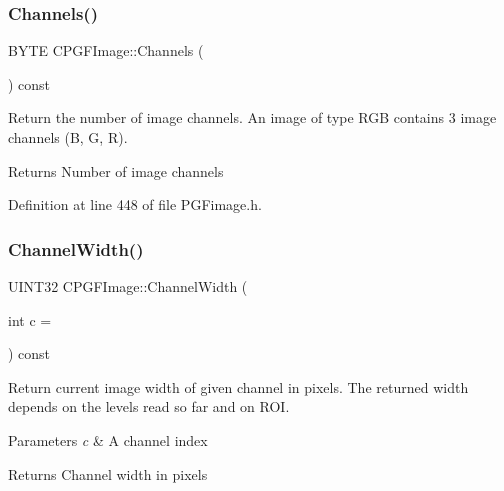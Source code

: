 \subsubsection{\texorpdfstring{Channels()}{Channels()}}
{\footnotesize\ttfamily B\+Y\+TE C\+P\+G\+F\+Image\+::\+Channels (\begin{DoxyParamCaption}{ }\end{DoxyParamCaption}) const\hspace{0.3cm}{\ttfamily [inline]}}

Return the number of image channels. An image of type R\+GB contains 3 image channels (B, G, R). \begin{DoxyReturn}{Returns}
Number of image channels 
\end{DoxyReturn}


Definition at line 448 of file P\+G\+Fimage.\+h.


\begin{DoxyCode}{0}

\end{DoxyCode}
\mbox{\label{classCPGFImage_a3db1d8a7c652f726b7f15fa3fdc7e958}} 
\subsubsection{\texorpdfstring{ChannelWidth()}{ChannelWidth()}}
{\footnotesize\ttfamily U\+I\+N\+T32 C\+P\+G\+F\+Image\+::\+Channel\+Width (\begin{DoxyParamCaption}\item[{int}]{c = {} }\end{DoxyParamCaption}) const\hspace{0.3cm}{\ttfamily [inline]}}

Return current image width of given channel in pixels. The returned width depends on the levels read so far and on R\+OI. 
\begin{DoxyParams}{Parameters}
{\em c} & A channel index \\
\hline
\end{DoxyParams}
\begin{DoxyReturn}{Returns}
Channel width in pixels 
\end{DoxyReturn}


